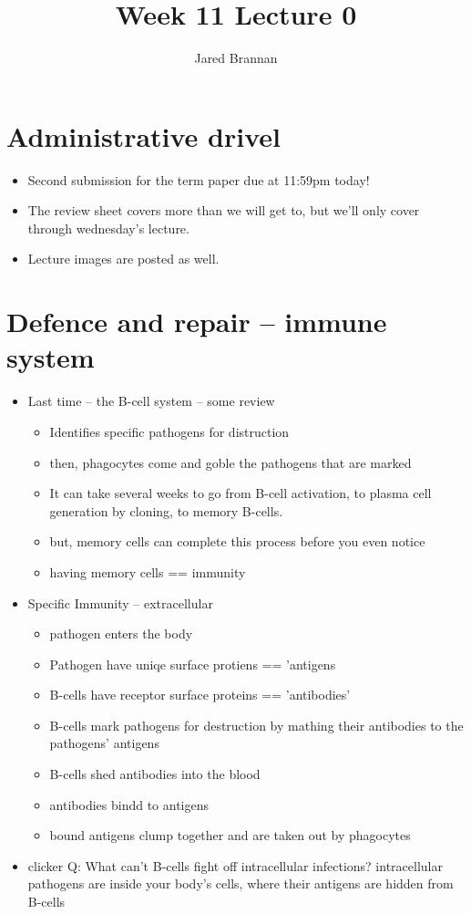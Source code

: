 \documentclass{article}
\title{Week 11 Lecture 0}
\author{Jared Brannan }
\theoremstyle{definition}
\begin{document}
\maketitle

\section{Administrative drivel}
\begin{itemize}
	\item Second submission for the term paper due at 11:59pm today!
	\item The review sheet covers more than we will get to, but we'll only cover through wednesday's lecture.
	\item Lecture images are posted as well.
\end{itemize}

\section{Defence and repair -- immune system}
\begin{itemize}
	\item Last time -- the B-cell system -- some review
		\begin{itemize}
			\item Identifies specific pathogens for distruction
			\item then, phagocytes come and goble the pathogens that are marked
			\item It can take several weeks to go from B-cell activation, to plasma cell generation by cloning, to memory B-cells.
			\item but, memory cells can complete this process before you even notice
			\item having memory cells == immunity
		\end{itemize}
	\item Specific Immunity -- extracellular
		\begin{itemize}
			\item pathogen enters the body
			\item Pathogen have uniqe surface protiens == 'antigens
			\item B-cells have receptor surface proteins == 'antibodies'
			\item B-cells mark pathogens for destruction by mathing their antibodies to the pathogens' antigens
			\item B-cells  shed antibodies into the blood
			\item antibodies bindd to antigens 
			\item bound antigens clump together and are taken out by phagocytes
		\end{itemize}
	\item clicker Q: What can't B-cells fight off intracellular infections? intracellular pathogens are inside your body's cells, where their antigens are hidden from B-cells
\end{itemize}
\end{document}
